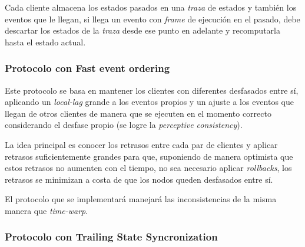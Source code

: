 Cada cliente almacena los estados pasados en una \emph{traza} de estados y también los eventos que le llegan, si llega un evento con \emph{frame} de ejecución en el pasado, debe descartar los estados de la \emph{traza} desde ese punto en adelante y recomputarla hasta el estado actual.

\subsubsection{Protocolo con Fast event ordering}

Este protocolo se basa en mantener los clientes con diferentes desfasados entre sí, aplicando un \emph{local-lag} grande a los eventos propios y un ajuste a los eventos que llegan de otros clientes de manera que se ejecuten en el momento correcto considerando el desfase propio (se logre la \emph{perceptive consistency}).

La idea principal es conocer los retrasos entre cada par de clientes y aplicar retrasos suficientemente grandes para que, suponiendo de manera optimista que estos retrasos no aumenten con el tiempo, no sea necesario aplicar \emph{rollbacks}, los retrasos se minimizan a costa de que los nodos queden desfasados entre sí.

El protocolo que se implementará manejará las inconsistencias de la misma manera que \emph{time-warp}.


\subsubsection{Protocolo con Trailing State Syncronization}





